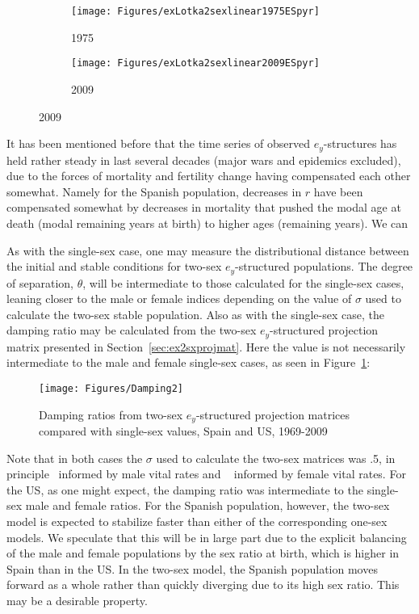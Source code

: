 \begin{figure}[!ht]
        \centering
        \caption{Spain, stable ($\sigma = 0.05$) versus initial
        $e_y$-structures, 1975 and 2009}
        \label{fig:stablevsinitES}
        \begin{subfigure}
                \centering
                \caption*{1975}
                \texttt{[image: Figures/exLotka2sexlinear1975ESpyr]}
        \end{subfigure}
        \begin{subfigure}
                \centering
                \caption*{2009}
                \texttt{[image: Figures/exLotka2sexlinear2009ESpyr]}
        \end{subfigure}
         
\end{figure}

It has been mentioned before that the time series of observed $e_y$-structures
has held rather steady in last several decades (major wars and epidemics excluded),
due to the forces of mortality and fertility change having compensated each
other somewhat. Namely for the Spanish population, decreases in $r$ have been
compensated somewhat by decreases in mortality that pushed the modal age at
death (modal remaining years at birth) to higher ages (remaining years). We can 

As with the single-sex case, one may measure the distributional distance between
the initial and stable conditions for two-sex $e_y$-structured populations. The
degree of separation, $\theta$, will be intermediate to those calculated for the 
single-sex cases, leaning closer to the male or
female indices depending on the value of $\sigma$ used to calculate the two-sex
stable population. Also as with the single-sex case, the damping
ratio may be calculated from the two-sex $e_y$-structured projection matrix 
presented in Section~\ref{sec:ex2sxprojmat}. Here the value is not
necessarily intermediate to the male and female single-sex cases, as seen in
Figure~\ref{fig:damping2}:

\begin{figure}[ht!]
        \centering  
          \caption{Damping ratios from two-sex $e_y$-structured projection
          matrices compared with single-sex values, Spain and US, 1969-2009}
           \texttt{[image: Figures/Damping2]}
          \label{fig:damping2}
\end{figure}
Note that in both cases the $\sigma$ used to calculate the two-sex matrices was
.5, in principle \textonehalf~informed by male vital rates and \textonehalf~
informed by female vital rates. For the US, as one might expect, the damping
ratio was intermediate to the single-sex male and female ratios. For
the Spanish population, however, the two-sex model is expected to stabilize
faster than either of the corresponding one-sex models. We speculate that this
will be in large part due to the explicit balancing of the male and female
populations by the sex ratio at birth, which is higher in Spain than in the US. 
In the two-sex model, the Spanish population moves forward as a whole rather 
than quickly diverging due to its high sex ratio. This may be a desirable
property.

